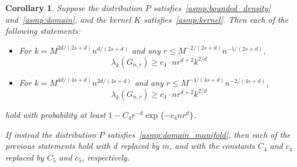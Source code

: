 \documentclass{article}
\newcommand{\1}{\mathbf{1}}
\theoremstyle{alden}
\theoremstyle{aldenthm}
\newtheorem{corollary}{Corollary}
\theoremstyle{definition}
\theoremstyle{remark}
\begin{document}
\begin{corollary}
	\label{cor:neighborhood_eigenvalue}
	Suppose the distribution $P$ satisfies~\ref{asmp:bounded_density} and~\ref{asmp:domain}, and the kernel $K$ satisfies~\ref{asmp:kernel}. Then each of the following statements:
	\begin{itemize}
		\item For $k = M^{2d/(2s + d)} n^{d/(2s + d)}$ and any $r \leq M^{-2/(2s + d)} n^{-1/(2s + d)}$, 
		\begin{equation}
		\label{eqn:neighborhood_eigenvalue_1}
		\lambda_{k}(G_{n,r}) \geq c_4 \cdot nr^{d+2}{k}^{2/d}
		\end{equation}
		\item For $k = M^{4d/(4s + d)}n^{2d/(4s + d)}$ and any $r \leq M^{-4/(4s + d)} n^{-2/(4s + d)}$,
		\begin{equation}
		\label{eqn:neighborhood_eigenvalue_2}
		\lambda_{k}(G_{n,r}) \geq c_4 \cdot nr^{d+2}{k}^{2/d}
		\end{equation}
	\end{itemize}
	hold with probability at least $1 - C_4 r^{-d} \exp\{- c_4 n r^d\}$.
	
	If instead the distribution $P$ satisfies~\ref{asmp:domain_manifold}, then each of the previous statements hold with $d$ replaced by $m$, and with the constants $C_4$ and $c_4$ replaced by $C_5$ and $c_5$, respectively.
\end{corollary}
\end{document}
